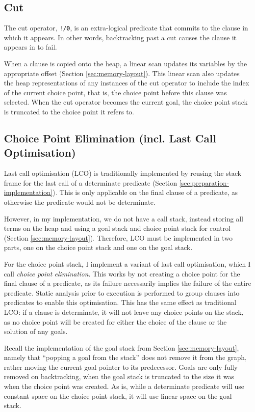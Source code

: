 \subsection{Cut}

The cut operator, \texttt{!/0}, is an extra-logical predicate that commits to the clause in which it appears. In other words, backtracking past a cut causes the clause it appears in to fail.

When a clause is copied onto the heap, a linear scan updates its variables by the appropriate offset (Section \ref{sec:memory-layout}). This linear scan also updates the heap representations of any instances of the cut operator to include the index of the current choice point, that is, the choice point before this clause was selected. When the cut operator becomes the current goal, the choice point stack is truncated to the choice point it refers to.

\subsection{Choice Point Elimination (incl. Last Call Optimisation)}

Last call optimisation (LCO) is traditionally implemented by reusing the stack frame for the last call of a determinate predicate (Section \ref{sec:preparation-implementation}). This is only applicable on the final clause of a predicate, as otherwise the predicate would not be determinate.

However, in my implementation, we do not have a call stack, instead storing all terms on the heap and using a goal stack and choice point stack for control (Section \ref{sec:memory-layout}). Therefore, LCO must be implemented in two parts, one on the choice point stack and one on the goal stack.

For the choice point stack, I implement a variant of last call optimisation, which I call \emph{choice point elimination}. This works by not creating a choice point for the final clause of a predicate, as its failure necessarily implies the failure of the entire predicate. Static analysis prior to execution is performed to group clauses into predicates to enable this optimisation. This has the same effect as traditional LCO: if a clause is determinate, it will not leave any choice points on the stack, as no choice point will be created for either the choice of the clause or the solution of any goals.

Recall the implementation of the goal stack from Section \ref{sec:memory-layout}, namely that ``popping a goal from the stack'' does not remove it from the graph, rather moving the current goal pointer to its predecessor. Goals are only fully removed on backtracking, when the goal stack is truncated to the size it was when the choice point was created. As is, while a determinate predicate will use constant space on the choice point stack, it will use linear space on the goal stack.

